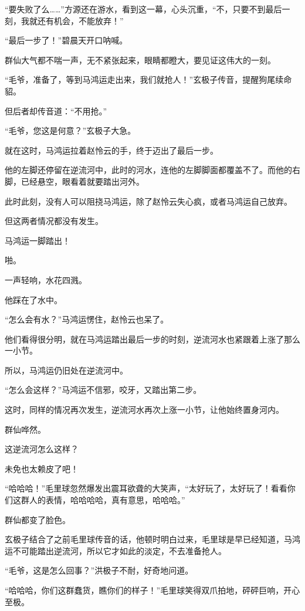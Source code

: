 
\begin{this_body}

“要失败了么……”方源还在游水，看到这一幕，心头沉重，“不，只要不到最后一刻，我就还有机会，不能放弃！”

“最后一步了！”碧晨天开口呐喊。

群仙大气都不喘一声，无不紧张起来，眼睛都瞪大，要见证这伟大的一刻。

“毛爷，准备了，等到马鸿运走出来，我们就抢人！”玄极子传音，提醒狗尾续命貂。

但后者却传音道：“不用抢。”

“毛爷，您这是何意？”玄极子大急。

就在这时，马鸿运拉着赵怜云的手，终于迈出了最后一步。

他的左脚还停留在逆流河中，此时的河水，连他的左脚脚面都覆盖不了。而他的右脚，已经悬空，眼看着就要踏出河外。

此时此刻，没有人可以阻挠马鸿运，除了赵怜云失心疯，或者马鸿运自己放弃。

但这两者情况都没有发生。

马鸿运一脚踏出！

啪。

一声轻响，水花四溅。

他踩在了水中。

“怎么会有水？”马鸿运愣住，赵怜云也呆了。

他们看得很分明，就在马鸿运踏出最后一步的时刻，逆流河水也紧跟着上涨了那么一小节。

所以，马鸿运仍旧处在逆流河中。

“怎么会这样？”马鸿运不信邪，咬牙，又踏出第二步。

这时，同样的情况再次发生，逆流河水再次上涨一小节，让他始终置身河内。

群仙哗然。

这逆流河怎么这样？

未免也太赖皮了吧！

“哈哈哈！”毛里球忽然爆发出震耳欲聋的大笑声，“太好玩了，太好玩了！看看你们这群人的表情，哈哈哈哈，真有意思，哈哈哈。”

群仙都变了脸色。

玄极子结合了之前毛里球传音的话，他顿时明白过来，毛里球是早已经知道，马鸿运不可能踏出逆流河，所以它才如此的淡定，不去准备抢人。

“毛爷，这是怎么回事？”洪极子不耐，好奇地问道。

“哈哈哈，你们这群蠢货，瞧你们的样子！”毛里球笑得双爪拍地，砰砰巨响，开心至极。


\end{this_body}
